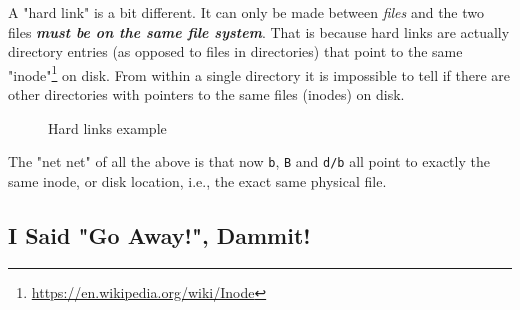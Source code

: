 \documentclass[10pt,american,]{book}
\newenvironment{Shaded}{\begin{snugshade}}{\end{snugshade}}
\newcommand{\KeywordTok}[1]{\textcolor[rgb]{0.13,0.29,0.53}{\textbf{{#1}}}}
\newcommand{\NormalTok}[1]{{#1}}
\renewcommand{\href}[2]{#2\footnote{\url{#1}}}
\numberwithin{figure}{chapter}
\DeclareRobustCommand{\drcap}[1]{\begin{figure}[H]\caption{#1}\end{figure}}
\renewcommand{\KeywordTok}[1]{{#1}}
\renewcommand{\NormalTok}[1]{{#1}}
\begin{document}
A "hard link" is a bit different. It can only be made between
\emph{files} and the two files \textbf{\emph{must be on the same file
system}}. That is because hard links are actually directory entries (as
opposed to files in directories) that point to the same
\href{https://en.wikipedia.org/wiki/Inode}{"inode"} on disk. From within
a single directory it is impossible to tell if there are other
directories with pointers to the same files (inodes) on disk.

\drcap{Hard links example}

\begin{Shaded}
\end{Shaded}

The "net net" of all the above is that now \texttt{b}, \texttt{B} and
\texttt{d/b} all point to exactly the same inode, or disk location,
i.e., the exact same physical file.

\subsection*{I Said "Go Away!", Dammit!}\label{i-said-go-away-dammit}
\end{document}
